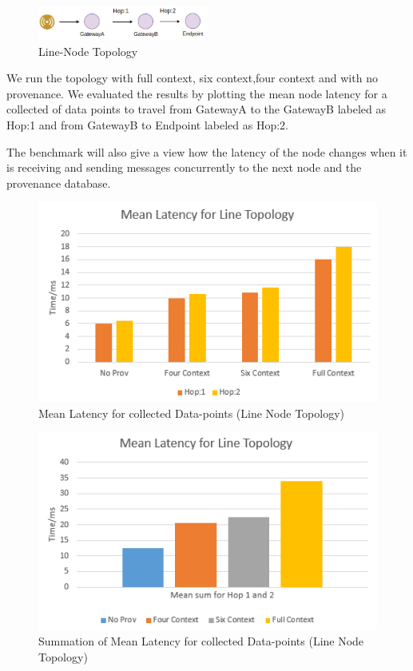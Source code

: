 \begin{figure}[H]
	\center
	\includegraphics[width=0.5\textwidth]{figures/latencytopo_line.png}
	\caption{Line-Node Topology}
	\label{fig:line_topo}
\end{figure}

We run the topology with full context, six context,four context and with no provenance. We evaluated the results by plotting the mean node latency for a collected of data points
to travel from GatewayA to the GatewayB labeled as Hop:1  and from GatewayB to Endpoint labeled as Hop:2.

The benchmark will also give a view how the latency of the node changes when it is receiving and sending messages concurrently to the next node and the provenance database.

\begin{figure}[H]
	\center
	\includegraphics[width=\textwidth]{figures/LineTopology_latency.PNG}
	\caption{Mean Latency for collected Data-points   (Line Node Topology)}
	\label{fig:linetopology_latency}
\end{figure}


\begin{figure}[H]
	\center
	\includegraphics[width=\textwidth]{figures/LineTopology_latency_sum.PNG}
	\caption{Summation of Mean Latency for collected Data-points   (Line Node Topology)}
	\label{fig:linetopology_sum_latency}
\end{figure}

